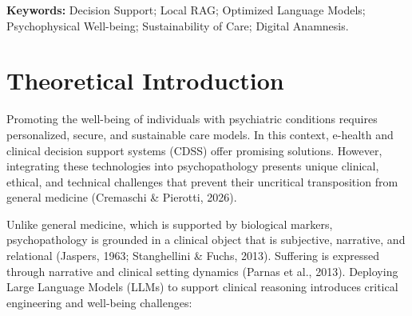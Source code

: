 \documentclass[11pt,a4paper]{article}
\begin{document}
\vspace{0.4cm}
\noindent \textbf{Keywords:} Decision Support; Local RAG; Optimized Language Models; Psychophysical Well-being; Sustainability of Care; Digital Anamnesis.

\newpage

\section{Theoretical Introduction}

Promoting the well-being of individuals with psychiatric conditions requires personalized, secure, and sustainable care models. In this context, e-health and clinical decision support systems (CDSS) offer promising solutions. However, integrating these technologies into psychopathology presents unique clinical, ethical, and technical challenges that prevent their uncritical transposition from general medicine (Cremaschi \& Pierotti, 2026).

Unlike general medicine, which is supported by biological markers, psychopathology is grounded in a clinical object that is subjective, narrative, and relational (Jaspers, 1963; Stanghellini \& Fuchs, 2013). Suffering is expressed through narrative and clinical setting dynamics (Parnas et al., 2013). Deploying Large Language Models (LLMs) to support clinical reasoning introduces critical engineering and well-being challenges:
\end{document}
